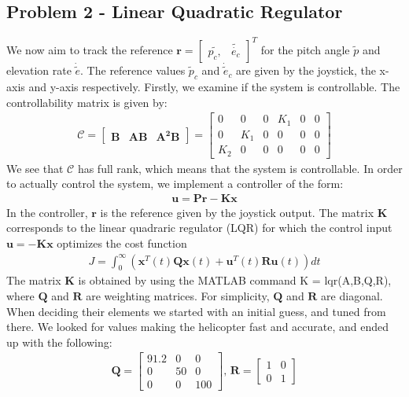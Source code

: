 \subsection{Problem 2 - Linear Quadratic Regulator}
We now aim to track the reference $\mathbf{r}
= \begin{bmatrix} \tilde{p_c,} & \tilde{\dot{e_c}}
\end{bmatrix}^T$ for the pitch angle $\tilde{p}$ and elevation rate $\dot{\tilde{e}}$. The reference values $\tilde{p}_c$ and $\dot{\tilde{e}}_c$ are given by the joystick, the x-axis and y-axis respectively. Firstly, we examine if the system is controllable. The controllability matrix is given by:
\begin{gather*}
    \mathcal{C} = 
    \begin{bmatrix} \mathbf{B} & \mathbf{AB} &
    \mathbf{A^2B} \end{bmatrix}
    = \begin{bmatrix}
    0 & 0 & 0 & K_1 & 0 & 0 \\
    0 & K_1 & 0 & 0 & 0 & 0 \\
    K_2 & 0 & 0 & 0 & 0 & 0
    \end{bmatrix}
\end{gather*}
We see that $\mathcal{C}$ has full rank, which means that the system is controllable. In order to actually control the system, we implement a controller of the form:
\begin{gather*}
    \mathbf{u} = \mathbf{Pr} - \mathbf{Kx}
\end{gather*}
In the controller, $\mathbf{r}$ is the reference given by the joystick output. The matrix $\mathbf{K}$ corresponds to the linear quadraric regulator (LQR) for which the control input $\mathbf{u} = -\mathbf{Kx}$ optimizes the cost function
\begin{gather*}
    \mathit{J} = \int_{0}^{\infty}(\mathbf{x}^T(t)
    \mathbf{Qx}(t) + \mathbf{u}^T(t)\mathbf{Ru}(t))
    \mathit{dt}
\end{gather*}
The matrix $\mathbf{K}$ is obtained by using the MATLAB command K = lqr(A,B,Q,R), where $\mathbf{Q}$ and $\mathbf{R}$ are weighting matrices. For simplicity, $\mathbf{Q}$ and $\mathbf{R}$ are diagonal. When deciding their elements we started with an initial guess, and tuned from there. We looked for values making the helicopter fast and accurate, and ended up with the following:
\begin{gather*}
    \mathbf{Q} = \begin{bmatrix}
    91.2 & 0 & 0 \\ 
    0 & 50 & 0 \\
    0 & 0 & 100 \end{bmatrix}\textbf{, } \mathbf{R} = \begin{bmatrix} 1 & 0 \\ 0 & 1 \end{bmatrix}
\end{gather*}
